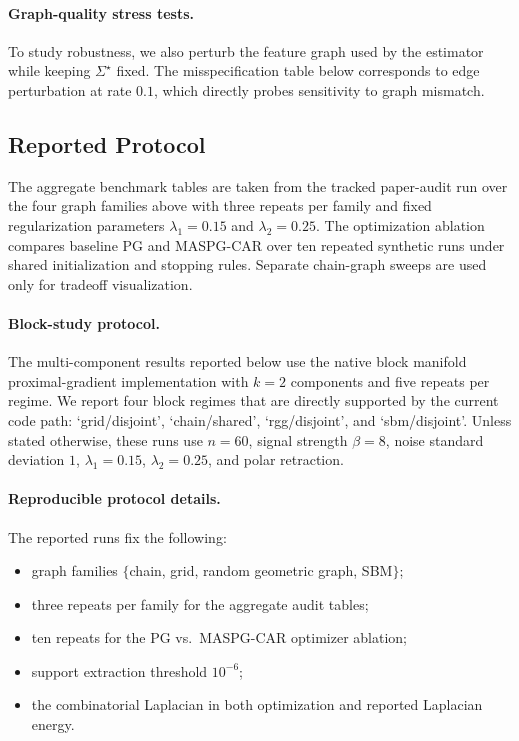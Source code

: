 \documentclass[10pt,twocolumn,letterpaper]{article}
\theoremstyle{definition}
\begin{document}
\paragraph{Graph-quality stress tests.}
To study robustness, we also perturb the feature graph used by the estimator while keeping $\Sigma^\star$ fixed. The misspecification table below corresponds to edge perturbation at rate $0.1$, which directly probes sensitivity to graph mismatch.

\subsection{Reported Protocol}
The aggregate benchmark tables are taken from the tracked paper-audit run over the four graph families above with three repeats per family and fixed regularization parameters $\lambda_1=0.15$ and $\lambda_2=0.25$. The optimization ablation compares baseline PG and MASPG-CAR over ten repeated synthetic runs under shared initialization and stopping rules. Separate chain-graph sweeps are used only for tradeoff visualization.

\paragraph{Block-study protocol.}
The multi-component results reported below use the native block manifold proximal-gradient implementation with $k=2$ components and five repeats per regime. We report four block regimes that are directly supported by the current code path: `grid/disjoint', `chain/shared', `rgg/disjoint', and `sbm/disjoint'. Unless stated otherwise, these runs use $n=60$, signal strength $\beta=8$, noise standard deviation $1$, $\lambda_1=0.15$, $\lambda_2=0.25$, and polar retraction.

\paragraph{Reproducible protocol details.}
The reported runs fix the following:
\begin{itemize}[leftmargin=*]
\item graph families $\{$chain, grid, random geometric graph, SBM$\}$;
\item three repeats per family for the aggregate audit tables;
\item ten repeats for the PG vs.\ MASPG-CAR optimizer ablation;
\item support extraction threshold $10^{-6}$;
\item the combinatorial Laplacian in both optimization and reported Laplacian energy.
\end{itemize}
\end{document}
